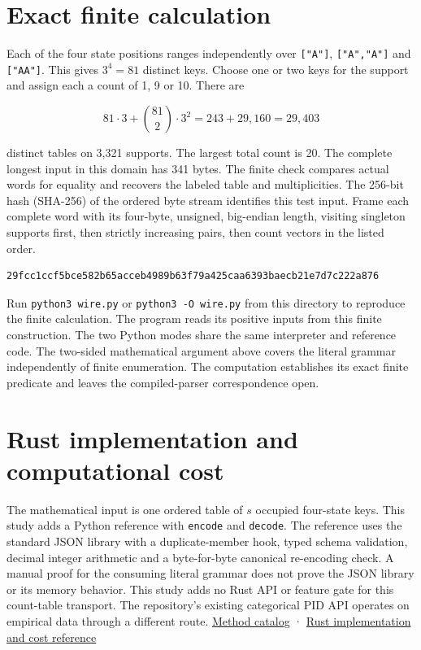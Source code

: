 \documentclass[11pt,a4paper]{article}
\begin{document}
\clearpage
\section{Exact finite calculation}\label{exact-finite-calculation}

Each of the four state positions ranges independently over \texttt{{[}"A"{]}}, \texttt{{[}"A","A"{]}} and \texttt{{[}"AA"{]}}. This gives \(3^4=81\) distinct keys. Choose one or two keys for the support and assign each a count of 1, 9 or 10. There are

\[
81\cdot 3 + \binom{81}{2}\cdot 3^2 = 243 + 29{,}160 = 29{,}403
\]

distinct tables on 3,321 supports. The largest total count is 20. The complete longest input in this domain has 341 bytes. The finite check compares actual words for equality and recovers the labeled table and multiplicities. The 256-bit hash (SHA-256) of the ordered byte stream identifies this test input. Frame each complete word with its four-byte, unsigned, big-endian length, visiting singleton supports first, then strictly increasing pairs, then count vectors in the listed order.

\begin{verbatim}
29fcc1ccf5bce582b65acceb4989b63f79a425caa6393baecb21e7d7c222a876
\end{verbatim}

Run \texttt{python3\ wire.py} or \texttt{python3\ -O\ wire.py} from this directory to reproduce the finite calculation. The program reads its positive inputs from this finite construction. The two Python modes share the same interpreter and reference code. The two-sided mathematical argument above covers the literal grammar independently of finite enumeration. The computation establishes its exact finite predicate and leaves the compiled-parser correspondence open.

\section{Rust implementation and computational cost}\label{rust-implementation-and-computational-cost}

The mathematical input is one ordered table of \(s\) occupied four-state keys. This study adds a Python reference with \texttt{encode} and \texttt{decode}. The reference uses the standard JSON library with a duplicate-member hook, typed schema validation, decimal integer arithmetic and a byte-for-byte canonical re-encoding check. A manual proof for the consuming literal grammar does not prove the JSON library or its memory behavior. This study adds no Rust API or feature gate for this count-table transport. The repository's existing categorical PID API operates on empirical data through a different route. \href{https://github.com/sepahead/pid-rs/blob/1479fc5e0ca15e5ef9c5521f8bc7aa36f2a98d20/METHODS.md}{Method catalog} · \href{https://github.com/sepahead/pid-rs/blob/1479fc5e0ca15e5ef9c5521f8bc7aa36f2a98d20/RUST_IMPLEMENTATION_AND_COST.md}{Rust implementation and cost reference}
\end{document}
